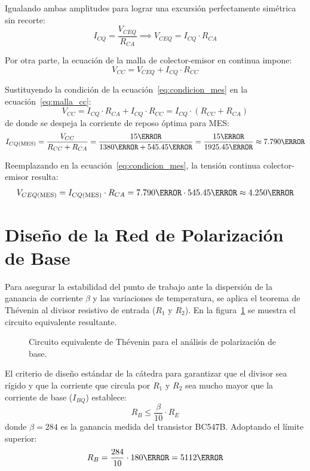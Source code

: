Igualando ambas amplitudes para lograr una excursión perfectamente simétrica sin recorte:
\begin{equation}
  I_{CQ} = \frac{V_{CEQ}}{R_{CA}} \implies V_{CEQ} = I_{CQ} \cdot R_{CA}
  \label{eq:condicion_mes}
\end{equation}

Por otra parte, la ecuación de la malla de colector-emisor en continua impone:
\begin{equation}
  V_{CC} = V_{CEQ} + I_{CQ} \cdot R_{CC}
  \label{eq:malla_cc}
\end{equation}

Sustituyendo la condición de la ecuación~\eqref{eq:condicion_mes} en la ecuación~\eqref{eq:malla_cc}:
\begin{equation}
  V_{CC} = I_{CQ} \cdot R_{CA} + I_{CQ} \cdot R_{CC} = I_{CQ} \cdot (R_{CC} + R_{CA})
\end{equation}
de donde se despeja la corriente de reposo óptima para MES:
\begin{equation}
  I_{CQ(\text{MES})} = \frac{V_{CC}}{R_{CC} + R_{CA}} = \frac{15\V}{1380\ohm + 545.45\ohm} = \frac{15\V}{1925.45\ohm} \approx 7.790\mA
  \label{eq:Icq_mes}
\end{equation}

Reemplazando en la ecuación~\eqref{eq:condicion_mes}, la tensión continua colector-emisor resulta:
\begin{equation}
  V_{CEQ(\text{MES})} = I_{CQ(\text{MES})} \cdot R_{CA} = 7.790\mA \cdot 545.45\ohm \approx 4.250\V
  \label{eq:Vceq_mes}
\end{equation}

\section{Diseño de la Red de Polarización de Base}

Para asegurar la estabilidad del punto de trabajo ante la dispersión de la ganancia de corriente $\beta$ y las
variaciones de temperatura, se aplica el teorema de Thévenin al divisor resistivo de entrada ($R_1$ y $R_2$).
En la figura~\ref{crkt:thevenin} se muestra el circuito equivalente resultante.

\begin{figure}[!ht]
  \centering
  
  \caption{Circuito equivalente de Thévenin para el análisis de polarización de base.}
  \label{crkt:thevenin}
\end{figure}

El criterio de diseño estándar de la cátedra para garantizar que el divisor sea rígido y que la corriente que circula
por $R_1$ y $R_2$ sea mucho mayor que la corriente de base ($I_{BQ}$) establece:
\begin{equation}
  R_B \le \frac{\beta}{10} \cdot R_E
  \label{eq:criterio_rb}
\end{equation}
donde $\beta = 284$ es la ganancia medida del transistor BC547B. Adoptando el límite superior:
\begin{equation}
  R_B = \frac{284}{10} \cdot 180\ohm = 5112\ohm
  \label{eq:Rb_calculada}
\end{equation}

